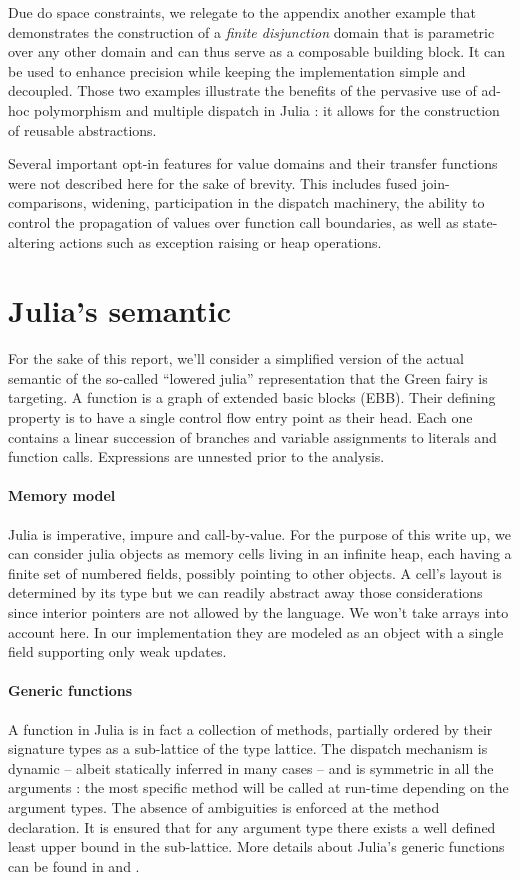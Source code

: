 \documentclass[11pt]{article}
\begin{document}
Due do space constraints, we relegate to the appendix another example that demonstrates the construction of a \emph{finite disjunction} domain that is parametric over any other domain and can thus serve as a composable building block. It can be used to enhance precision while keeping the implementation simple and decoupled.
Those two examples illustrate the benefits of the pervasive use of ad-hoc polymorphism and multiple dispatch in Julia : it allows for the construction of reusable abstractions.

Several important opt-in features for value domains and their transfer functions were not described here for the sake of brevity. This includes fused join-comparisons, widening, participation in the dispatch machinery, the ability to control the propagation of values over function call boundaries, as well as state-altering actions such as exception raising or heap operations.

\section*{Julia's semantic}

For the sake of this report, we'll consider a simplified version of the actual semantic of the so-called ``lowered julia'' representation that the Green fairy is targeting.
A function is a graph of extended basic blocks (EBB). Their defining property is to have a single control flow entry point as their head. Each one contains a linear succession of branches and variable assignments to literals and function calls.
Expressions are unnested prior to the analysis.

\paragraph{Memory model} Julia is imperative, impure and call-by-value.
For the purpose of this write up, we can consider julia objects as memory cells living in an infinite heap, each having a finite set of numbered fields, possibly pointing to other objects.
A cell's layout is determined by its type but we can readily abstract away those considerations since interior pointers are not allowed by the language.
We won't take arrays into account here. In our implementation they are modeled as an object with a single field supporting only weak updates.

\paragraph{Generic functions} A function in Julia is in fact a collection of methods, partially ordered by their signature types as a sub-lattice of the type lattice.
The dispatch mechanism is dynamic -- albeit statically inferred in many cases -- and is symmetric in all the arguments : the most specific method will be called at run-time depending on the argument types.
The absence of ambiguities is enforced at the method declaration.
It is ensured that for any argument type there exists a well defined least upper bound in the sub-lattice.
More details about Julia's generic functions can be found in \cite{julia-paper} and \cite{jeff-phd}.
\end{document}
